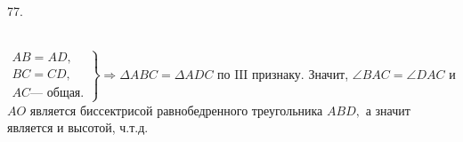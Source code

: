 77. \begin{figure}[ht!]
\end{figure}\\
$\left.\begin{array}{l}AB=AD,\\
BC=CD,\\
AC\text{--- общая.}  \end{array}\right\}\Rightarrow \Delta ABC=\Delta ADC\text{ по III признаку.}$ Значит, $\angle BAC=\angle DAC$ и $AO$ является биссектрисой равнобедренного треугольника $ABD,$ а значит является и высотой, ч.т.д.\\
